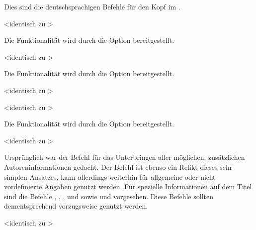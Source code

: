 \begin{DeclareEntity}{}
\begin{Declaration}
\begin{Declaration}
\begin{Declaration}
\begin{Declaration}
Dies sind die deutschsprachigen Befehle für den Kopf im \CD.
\end{Declaration}
\end{Declaration}
\end{Declaration}
\end{Declaration}

\begin{Declaration}
  {}
  <identisch zu >
\printdeclarationlist

Die Funktionalität wird durch die Option  bereitgestellt.
\end{Declaration}

\begin{Declaration}
  {}
  <identisch zu >
\printdeclarationlist

Die Funktionalität wird durch die Option  bereitgestellt.
\end{Declaration}

\begin{Declaration}
  {}
  <identisch zu >
\begin{Declaration}
  {}
  <identisch zu >
\printdeclarationlist

Die Funktionalität wird durch die Option  bereitgestellt.
\end{Declaration}
\end{Declaration}

\begin{Declaration}
  {}
  <identisch zu >
\printdeclarationlist

Ursprünglich war der Befehl für das Unterbringen aller möglichen, zusätzlichen 
Autoreninformationen gedacht. Der Befehl  
ist ebenso ein Relikt dieses sehr simplen Ansatzes, kann allerdings weiterhin 
für allgemeine oder nicht vordefinierte Angaben genutzt werden. Für spezielle 
Informationen auf dem Titel sind die Befehle , 
, ,  
und  sowie  und 
 vorgesehen. Diese Befehle sollten dementsprechend 
vorzugsweise genutzt werden.
\end{Declaration}

\begin{Declaration}
  {}
  <identisch zu >
\printdeclarationlist


\end{Declaration}
\end{DeclareEntity}
